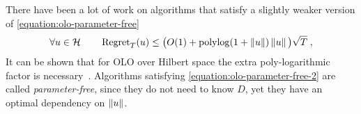 There have been a lot of work on algorithms
\citep{Streeter-McMahan-2012, Orabona-2013, McMahan-Abernethy-2013,
McMahan-Orabona-2014,Orabona-Pal-2016-parameter-free} that satisfy a slightly weaker version of
\eqref{equation:olo-parameter-free}
%
\begin{equation}
\label{equation:olo-parameter-free-2}
\forall u \in \mathcal{H} \qquad \operatorname{Regret}_T(u) \le \big(O(1)+\operatorname{polylog}(1 + \left\|{u}\right\|)\left\|{u}\right\| \big) \sqrt{T} \; ,
\end{equation}
%
It can be shown
that for \ac{OLO} over Hilbert space the extra poly-logarithmic factor is
necessary~\citep{McMahan-Abernethy-2013,Orabona-2013}. Algorithms satisfying
\eqref{equation:olo-parameter-free-2} are called \emph{parameter-free}, since
they do not need to know $D$, yet they have an optimal dependency on $\left\|{u}\right\|$.

